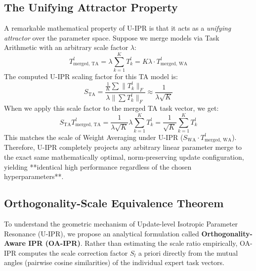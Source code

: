 \documentclass{article}
\begin{document}
\subsection{The Unifying Attractor Property}
A remarkable mathematical property of U-IPR is that it acts as a \textit{unifying attractor} over the parameter space.
Suppose we merge models via Task Arithmetic with an arbitrary scale factor $\lambda$:
\begin{equation}
    T_{\text{merged, TA}}^l = \lambda \sum_{k=1}^K T_k^l = K \lambda \cdot T_{\text{merged, WA}}^l
\end{equation}
The computed U-IPR scaling factor for this TA model is:
\begin{equation}
    S_{\text{TA}} = \frac{\frac{1}{K} \sum \|T_k^l\|_F}{\lambda \|\sum T_k^l\|_F} \approx \frac{1}{\lambda \sqrt{K}}
\end{equation}
When we apply this scale factor to the merged TA task vector, we get:
\begin{equation}
    S_{\text{TA}} T_{\text{merged, TA}}^l = \frac{1}{\lambda \sqrt{K}} \lambda \sum_{k=1}^K T_k^l = \frac{1}{\sqrt{K}} \sum_{k=1}^K T_k^l
\end{equation}
This matches the scale of Weight Averaging under U-IPR ($S_{\text{WA}} \cdot T_{\text{merged, WA}}^l$).
Therefore, U-IPR completely projects any arbitrary linear parameter merge to the exact same
mathematically optimal, norm-preserving update configuration, yielding **identical high performance
regardless of the chosen hyperparameters**.

\subsection{Orthogonality-Scale Equivalence Theorem}
To understand the geometric mechanism of Update-level Isotropic Parameter Resonance (U-IPR), we propose an analytical formulation called \textbf{Orthogonality-Aware IPR (OA-IPR)}. Rather than estimating the scale ratio empirically, OA-IPR computes the scale correction factor $S_l$ a priori directly from the mutual angles (pairwise cosine similarities) of the individual expert task vectors.
\end{document}
